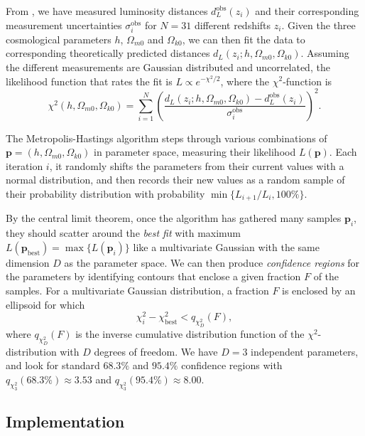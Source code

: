\documentclass[10pt,a4paper]{article}
\begin{document}
From \cite{betouleImprovedCosmologicalConstraints2014},
we have measured luminosity distances $d_{L}^\text{obs}(z_i)$ and their
corresponding measurement uncertainties $\sigma_i^\text{obs}$
for $N=31$ different redshifts $z_i$.
Given the three cosmological parameters $h$, $\Omega_{m0}$ and $\Omega_{k0}$,
we can then fit the data to corresponding theoretically predicted distances $d_L(z_i; h, \Omega_{m0}, \Omega_{k0})$.
Assuming the different measurements are Gaussian distributed and uncorrelated,
the likelihood function that rates the fit is $L \propto e^{-\chi^2/2}$, where the $\chi^2$-function is
\begin{equation}
	\chi^2(h,\Omega_{m0},\Omega_{k0}) = \sum_{i=1}^{N} \left( \frac{d_L(z_i; h, \Omega_{m0}, \Omega_{k0}) - d_{L}^\text{obs}(z_i)}{\sigma_i^\text{obs}} \right)^2.
\label{eq_chi2}
\end{equation}

The Metropolis-Hastings algorithm steps through various combinations of $\mathbf{p} = (h,\Omega_{m0},\Omega_{k0})$ in parameter space, measuring their likelihood $L(\mathbf{p})$.
Each iteration $i$, it randomly shifts the parameters from their current values with a normal distribution,
and then records their new values as a random sample of their probability distribution with probability $\min\big\{L_{i+1}/L_i, 100\%\big\}$.

By the central limit theorem, once the algorithm has gathered many samples $\mathbf{p}_i$,
they should scatter around the \emph{best fit}
with maximum $L(\mathbf{p}_\text{best}) = \max\{L(\mathbf{p}_i)\}$
like a multivariate Gaussian with the same dimension $D$ as the parameter space.
We can then produce \emph{confidence regions} for the parameters
by identifying contours that enclose a given fraction $F$ of the samples.
For a multivariate Gaussian distribution, a fraction $F$ is enclosed by an ellipsoid
for which
\begin{equation}
	\chi^2_i - \chi^2_\text{best} < q_{\chi^2_D}(F),
\label{eq_confidence_region}
\end{equation}
where $q_{\chi^2_D}(F)$ is the inverse cumulative distribution function of the $\chi^2$-distribution with $D$ degrees of freedom.
We have $D=3$ independent parameters, and look for standard $68.3\%$ and $95.4\%$ confidence regions
with $q_{\chi^2_3}(68.3\%) \approx 3.53$ and $q_{\chi^2_3}(95.4\%) \approx 8.00$.

\subsection{Implementation}
\end{document}
